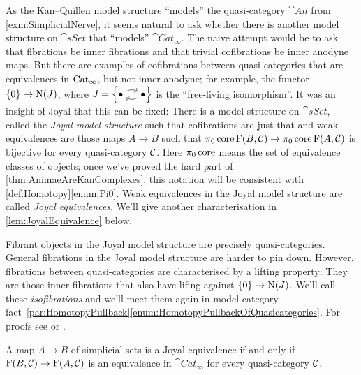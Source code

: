 \begin{exm}\label{exm:JoyalModelStructure}
	As the Kan--Quillen model structure \enquote{models} the quasi-category $\cat{An}$ from  \cref{exm:SimplicialNerve}, it seems natural to ask whether there is another model structure on $\cat{sSet}$ that \enquote{models} $\cat{Cat}_\infty$. The naive attempt would be to ask that fibrations be inner fibrations and that trivial cofibrations be inner anodyne maps. But there are examples of cofibrations between quasi-categories that are equivalences in $\mathrm{Cat}_\infty$, but not inner anodyne; for example, the functor $\{0\}\rightarrow \operatorname{N}(J)$, where $J=\left\{\InlineJ\right\}$ is the \enquote{free-living isomorphism}. It was an insight of Joyal that this can be fixed: There is a model structure on $\cat{sSet}$, called the \emph{Joyal model structure} such that cofibrations are just that and weak equivalences are those maps $A\rightarrow B$ such that $\pi_0\operatorname{core}\operatorname{F}(B,\mathcal{C})\rightarrow \pi_0\operatorname{core}\operatorname{F}(A,\mathcal{C})$ is bijective for every quasi-category $\mathcal{C}$. Here $\pi_0\operatorname{core}$ means the set of equivalence classes of objects; once we've proved the hard part of \cref{thm:AnimaeAreKanComplexes}, this notation will be consistent with \cref{def:Homotopy}\cref{enum:Pi0}. Weak equivalences in the Joyal model structure are called \emph{Joyal equivalences}. We'll give another characterisation in \cref{lem:JoyalEquivalence} below.
	
	Fibrant objects in the Joyal model structure are precisely quasi-categories. General fibrations in the Joyal model structure are harder to pin down. However, fibrations between quasi-categories are characterised by a lifting property: They are those inner fibrations that also have lifing against $\{0\}\rightarrow\operatorname{N}(J)$. We'll call these \emph{isofibrations} and we'll meet them again in model category fact~\cref{par:HomotopyPullback}\cref{enum:HomotopyPullbackOfQuasicategories}. For proofs see \cite[Theorem~\href{https://mat.uab.cat/~kock/crm/hocat/advanced-course/Quadern45-2.pdf\#page=153}{6.12}]{JoyalQuasiCategoriesAndApplications} or \cite[Theorem~VIII.23]{HigherCatsII}.
\end{exm}
\begin{lem}\label{lem:JoyalEquivalence}
	A map $A\rightarrow B$ of simplicial sets is a Joyal equivalence if and only if $\operatorname{F}(B,\mathcal{C})\rightarrow\operatorname{F}(A,\mathcal{C})$ is an equivalence in $\cat{Cat}_\infty$ for every quasi-category $\mathcal{C}$.
\end{lem}
